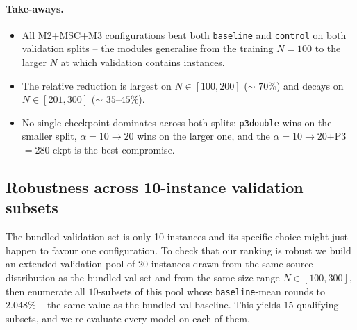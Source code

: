 \documentclass[11pt,a4paper]{article}
\begin{document}
\paragraph{Take-aways.}
%
\begin{itemize}
  \item All M2+MSC+M3 configurations beat both \texttt{baseline} and
        \texttt{control} on both validation splits -- the modules
        generalise from the training $N\!=\!100$ to the larger $N$ at
        which validation contains instances.
  \item The relative reduction is largest on $N\!\in\![100,200]$
        ($\sim$ $70\%$) and decays on $N\!\in\![201,300]$
        ($\sim$ $35$--$45\%$).
  \item No single checkpoint dominates across both splits:
        \texttt{p3double} wins on the smaller split,
        $\alpha\!=\!10\!\to\!20$ wins on the larger one, and the
        $\alpha\!=\!10\!\to\!20$+P3$=$280 ckpt is the best compromise.
\end{itemize}

\subsection{Robustness across 10-instance validation subsets}
\label{sec:robust}

The bundled validation set is only 10 instances and its specific choice
might just happen to favour one configuration. To check that our ranking is
robust we build an extended validation pool of 20 instances drawn from the
same source distribution as the bundled val set and from the same size
range $N\!\in\![100,300]$, then enumerate all $10$-subsets of this pool
whose \texttt{baseline}-mean rounds to $2.048\%$ -- the same value as the
bundled val baseline. This yields $15$ qualifying subsets, and we
re-evaluate every model on each of them.
\end{document}
